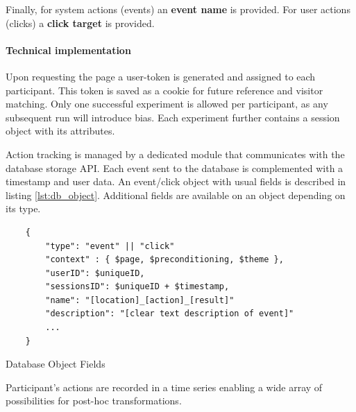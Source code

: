 	Finally, for system actions (events) an \textbf{event name} is provided. For user actions (clicks) a \textbf{click target} is provided.
	

	

		
		\paragraph{Technical implementation}
		
		Upon requesting the page a user-token is generated and assigned to each participant. 
		This token is saved as a cookie for future reference and visitor matching. 
		Only one successful experiment is allowed per participant, as any subsequent run will introduce bias.
		Each experiment further contains a session object with its attributes. 
		
		
		Action tracking is managed by a dedicated module that communicates with the database storage API. Each event sent to the database is complemented with a timestamp and user data. An event/click object with usual fields is described in listing \ref{lst:db_object}. Additional fields are available on an object depending on its type.

	\begin{listing}[h]
		\begin{verbatim}
	{
		"type": "event" || "click"
		"context" : { $page, $preconditioning, $theme },
		"userID": $uniqueID,
		"sessionsID": $uniqueID + $timestamp,
		"name": "[location]_[action]_[result]"
		"description": "[clear text description of event]"
		...
	}
		\end{verbatim}
		\caption{Database Object Fields}
		\label{lst:db_object}
	\end{listing}

		Participant's actions are recorded in a time series enabling a wide array of possibilities for post-hoc transformations.
		
		

